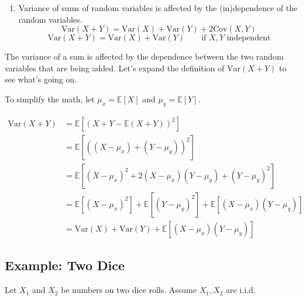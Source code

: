 \documentclass[
  letterpaper,
  DIV=11,
  numbers=noendperiod]{scrreprt}
\providecommand{\tightlist}{%
  \setlength{\itemsep}{0pt}\setlength{\parskip}{0pt}}\usepackage{longtable,booktabs,array}
\begin{document}
\begin{enumerate}
\def\labelenumi{\arabic{enumi}.}
\setcounter{enumi}{1}
\tightlist
\item
  Variance of sums of random variables is affected by the (in)dependence
  of the random variables.
  \[\text{Var}(X + Y) = \text{Var}(X) + \text{Var}(Y) + 2\text{Cov}(X,Y)\]
  \[\text{Var}(X + Y) = \text{Var}(X) + \text{Var}(Y) \qquad \text{if } X, Y \text{ independent}\]
\end{enumerate}

\begin{tcolorbox}[enhanced jigsaw, titlerule=0mm, bottomtitle=1mm, arc=.35mm, colframe=quarto-callout-tip-color-frame, rightrule=.15mm, opacityback=0, opacitybacktitle=0.6, leftrule=.75mm, breakable, toprule=.15mm, colback=white, left=2mm, colbacktitle=quarto-callout-tip-color!10!white, toptitle=1mm, bottomrule=.15mm, title=\textcolor{quarto-callout-tip-color}{\faLightbulb}\hspace{0.5em}{Proof}, coltitle=black]

The variance of a sum is affected by the dependence between the two
random variables that are being added. Let's expand the definition of
\(\text{Var}(X + Y)\) to see what's going on.

To simplify the math, let \(\mu_x = \mathbb{E}[X]\) and
\(\mu_y = \mathbb{E}[Y]\).

\[ \begin{align}
\text{Var}(X + Y) &= \mathbb{E}[(X+Y- \mathbb{E}(X+Y))^2] \\
&= \mathbb{E}[((X - \mu_x) + (Y - \mu_y))^2] \\
&= \mathbb{E}[(X - \mu_x)^2 + 2(X - \mu_x)(Y - \mu_y) + (Y - \mu_y)^2] \\
&= \mathbb{E}[(X - \mu_x)^2] + \mathbb{E}[(Y - \mu_y)^2] + \mathbb{E}[(X - \mu_x)(Y - \mu_y)] \\
&= \text{Var}(X) + \text{Var}(Y) + \mathbb{E}[(X - \mu_x)(Y - \mu_y)] 
\end{align}\]

\end{tcolorbox}

\subsection{Example: Two Dice}\label{example-two-dice}

Let \(X_1\) and \(X_2\) be numbers on two dice rolls. Assume
\(X_1, X_2\) are i.i.d.
\end{document}
